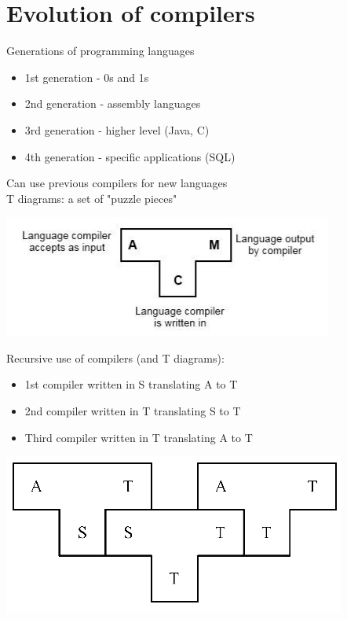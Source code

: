 \documentclass{article}[18pt]
\begin{document}
\section{Evolution of compilers}
Generations of programming languages
\begin{itemize}
	\item 1st generation - 0s and 1s
	\item 2nd generation - assembly languages
	\item 3rd generation - higher level (Java, C)
	\item 4th generation - specific applications (SQL)
\end{itemize}
Can use previous compilers for new languages\\
T diagrams: a set of "puzzle pieces"
\begin{center}
	\includegraphics[scale=0.7]{"T Diagram"}
\end{center}
Recursive use of compilers (and T diagrams):
\begin{itemize}
	\item 1st compiler written in S translating A to T
	\item 2nd compiler written in T translating S to T
	\item Third compiler written in T translating A to T
\end{itemize}
\begin{center}
	\includegraphics[scale=0.7]{"Recursive Compiler"}
\end{center}
\end{document}
